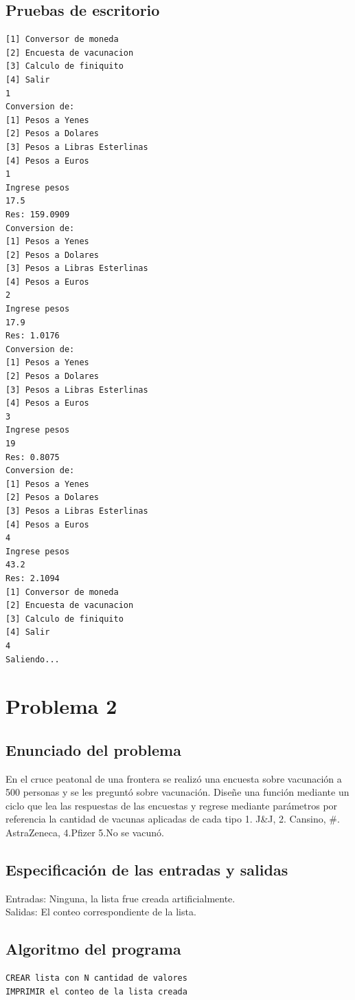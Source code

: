 \documentclass[12pt]{article}
\begin{document}
\subsection{Pruebas de escritorio }
\begin{verbatim}
[1] Conversor de moneda
[2] Encuesta de vacunacion
[3] Calculo de finiquito
[4] Salir
1
Conversion de:
[1] Pesos a Yenes
[2] Pesos a Dolares
[3] Pesos a Libras Esterlinas
[4] Pesos a Euros
1
Ingrese pesos
17.5
Res: 159.0909
Conversion de:
[1] Pesos a Yenes
[2] Pesos a Dolares
[3] Pesos a Libras Esterlinas
[4] Pesos a Euros
2
Ingrese pesos
17.9
Res: 1.0176
Conversion de:
[1] Pesos a Yenes
[2] Pesos a Dolares
[3] Pesos a Libras Esterlinas
[4] Pesos a Euros
3
Ingrese pesos
19
Res: 0.8075
Conversion de:
[1] Pesos a Yenes
[2] Pesos a Dolares
[3] Pesos a Libras Esterlinas
[4] Pesos a Euros
4
Ingrese pesos
43.2
Res: 2.1094
[1] Conversor de moneda
[2] Encuesta de vacunacion
[3] Calculo de finiquito
[4] Salir
4
Saliendo...
\end{verbatim}
\section{Problema 2}

\subsection{Enunciado del problema}
En el cruce peatonal de una frontera se realiz\'{o} una encuesta sobre vacunaci\'{o}n a 500 personas y se les pregunt\'{o} sobre vacunaci\'{o}n. Dise\~{n}e una funci\'{o}n mediante un ciclo que lea las respuestas de las encuestas y regrese mediante par\'{a}metros por referencia la cantidad de vacunas aplicadas de cada tipo 1. J&J, 2. Cansino, #. AstraZeneca, 4.Pfizer 5.No se vacun\'{o}.
\subsection{Especificación de las entradas y salidas}
Entradas: Ninguna, la lista frue creada artificialmente.\\
Salidas: El conteo correspondiente de la lista.
\subsection{Algoritmo del programa}
\begin{verbatim}
CREAR lista con N cantidad de valores
IMPRIMIR el conteo de la lista creada
\end{verbatim}
\end{document}
